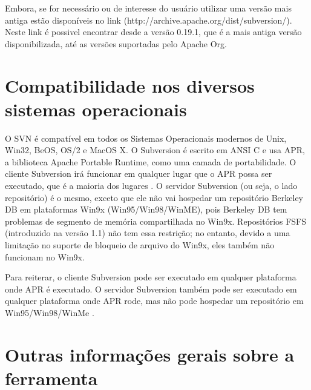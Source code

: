  Embora, se for necessário ou de interesse do usuário utilizar uma versão mais antiga estão disponíveis no link (http://archive.apache.org/dist/subversion/). Neste link é possivel encontrar desde a versão 0.19.1, que é a mais antiga versão disponibilizada, até as versões suportadas pelo Apache Org.

\section{Compatibilidade nos diversos sistemas operacionais}

  O SVN é compatível em todos os Sistemas Operacionais modernos de Unix, Win32, BeOS, OS/2 e MacOS X. O Subversion é escrito em ANSI C e usa APR, a biblioteca Apache Portable Runtime, como uma camada de portabilidade. O cliente Subversion irá funcionar em qualquer lugar que o APR possa ser executado, que é a maioria dos lugares \cite{apache-faq}. O servidor Subversion (ou seja, o lado repositório) é o mesmo, exceto que ele não vai hospedar um repositório Berkeley DB em plataformas Win9x (Win95/Win98/WinME), pois Berkeley DB tem problemas de segmento de memória compartilhada no Win9x. Repositórios FSFS (introduzido na versão 1.1) não tem essa restrição; no entanto, devido a uma limitação no suporte de bloqueio de arquivo do Win9x, eles também não funcionam no Win9x.

  Para reiterar, o cliente Subversion pode ser executado em qualquer plataforma onde APR é executado. O servidor Subversion também pode ser executado em qualquer plataforma onde APR rode, mas não pode hospedar um repositório em Win95/Win98/WinMe \cite{apache-faq}.

\section{Outras informações gerais sobre a ferramenta}
